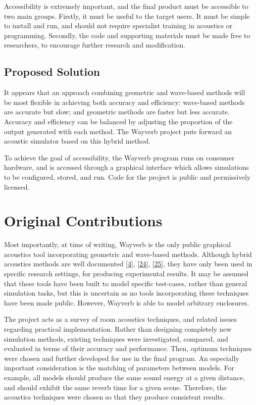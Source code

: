 \documentclass[]{scrreprt}
\begin{document}
Accessibility is extremely important, and the final product must be
accessible to two main groups. Firstly, it must be useful to the target
users. It must be simple to install and run, and should not require
specialist training in acoustics or programming. Secondly, the code and
supporting materials must be made free to researchers, to encourage
further research and modification.

\subsection{Proposed Solution}\label{proposed-solution}

It appears that an approach combining geometric and wave-based methods
will be most flexible in achieving both accuracy and efficiency:
wave-based methods are accurate but slow; and geometric methods are
faster but less accurate. Accuracy and efficiency can be balanced by
adjusting the proportion of the output generated with each method. The
Wayverb project puts forward an acoustic simulator based on this hybrid
method.

To achieve the goal of accessibility, the Wayverb program runs on
consumer hardware, and is accessed through a graphical interface which
allows simulations to be configured, stored, and run. Code for the
project is public and permissively licensed.

\section{Original Contributions}\label{original-contributions}

Most importantly, at time of writing, Wayverb is the only public
graphical acoustics tool incorporating geometric and wave-based methods.
Although hybrid acoustics methods are well documented
{[}\protect\hyperlink{ref-aretzux5fcombinedux5f2009}{4}{]},
{[}\protect\hyperlink{ref-southernux5fhybridux5f2013}{24}{]},
{[}\protect\hyperlink{ref-murphyux5fhybridux5f2008}{25}{]}, they have
only been used in specific research settings, for producing experimental
results. It may be assumed that these tools have been built to model
specific test-cases, rather than general simulation tasks, but this is
uncertain as no tools incorporating these techniques have been made
public. However, Wayverb is able to model arbitrary enclosures.

The project acts as a survey of room acoustics techniques, and related
issues regarding practical implementation. Rather than designing
completely new simulation methods, existing techniques were
investigated, compared, and evaluated in terms of their accuracy and
performance. Then, optimum techniques were chosen and further developed
for use in the final program. An especially important consideration is
the matching of parameters between models. For example, all models
should produce the same sound energy at a given distance, and should
exhibit the same reverb time for a given scene. Therefore, the acoustics
techniques were chosen so that they produce consistent results.
\end{document}
